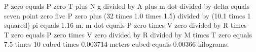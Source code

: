 P zero equals P zero T plus N g divided by A plus m dot divided by delta equals seven point zero five P zero plus (32 times 1.0 times 1.5) divided by (10.1 times 1 squared) pi equals 1.16 m.  
m dot equals P zero times V zero divided by R times T zero equals P zero times V zero divided by R divided by M times T zero equals 7.5 times 10 cubed times 0.003714 meters cubed equals 0.00366 kilograms.
